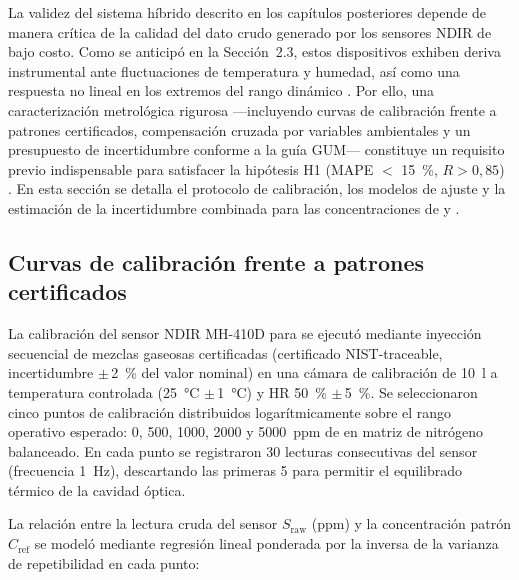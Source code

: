 
La validez del sistema híbrido descrito en los capítulos posteriores depende de manera crítica de la calidad del dato crudo generado por los sensores NDIR de bajo costo. Como se anticipó en la Sección~2.3, estos dispositivos exhiben deriva instrumental ante fluctuaciones de temperatura y humedad, así como una respuesta no lineal en los extremos del rango dinámico \parencite{biagiDevelopmentMachineLearningbased2024a, herrinCollateralDataQualitya}. Por ello, una caracterización metrológica rigurosa ---incluyendo curvas de calibración frente a patrones certificados, compensación cruzada por variables ambientales y un presupuesto de incertidumbre conforme a la guía GUM--- constituye un requisito previo indispensable para satisfacer la hipótesis H1 (MAPE $<$ \SI{15}{\percent}, $R > 0{,}85$) \parencite{rossiEstimatingDynamicsGreenhouse2024a, parodiBioconversionEfficienciesGreenhouse2020a}. En esta sección se detalla el protocolo de calibración, los modelos de ajuste y la estimación de la incertidumbre combinada para las concentraciones de  y .

\subsection{Curvas de calibración frente a patrones certificados}
\label{subsec:cap2_curvas_calibracion}

La calibración del sensor NDIR MH-410D para  se ejecutó mediante inyección secuencial de mezclas gaseosas certificadas (certificado NIST-traceable, incertidumbre $\pm$\,\SI{2}{\percent} del valor nominal) en una cámara de calibración de \SI{10}{\litre} a temperatura controlada (\SI{25}{\celsius} $\pm$\,\SI{1}{\celsius}) y HR \SI{50}{\percent} $\pm$\,\SI{5}{\percent}. Se seleccionaron cinco puntos de calibración distribuidos logarítmicamente sobre el rango operativo esperado: \num{0}, \num{500}, \num{1000}, \num{2000} y \num{5000}~ppm de  en matriz de nitrógeno balanceado. En cada punto se registraron \num{30} lecturas consecutivas del sensor (frecuencia \SI{1}{Hz}), descartando las primeras \num{5} para permitir el equilibrado térmico de la cavidad óptica.

La relación entre la lectura cruda del sensor $S_{\text{raw}}$ (ppm) y la concentración patrón $C_{\text{ref}}$ se modeló mediante regresión lineal ponderada por la inversa de la varianza de repetibilidad en cada punto:

